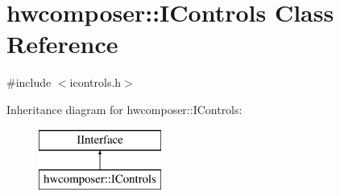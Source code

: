\hypertarget{classhwcomposer_1_1IControls}{}\section{hwcomposer\+:\+:I\+Controls Class Reference}
\label{classhwcomposer_1_1IControls}


{\ttfamily \#include $<$icontrols.\+h$>$}

Inheritance diagram for hwcomposer\+:\+:I\+Controls\+:\begin{figure}[H]
\begin{center}
\leavevmode
\includegraphics[height=2.000000cm]{classhwcomposer_1_1IControls}
\end{center}
\end{figure}
